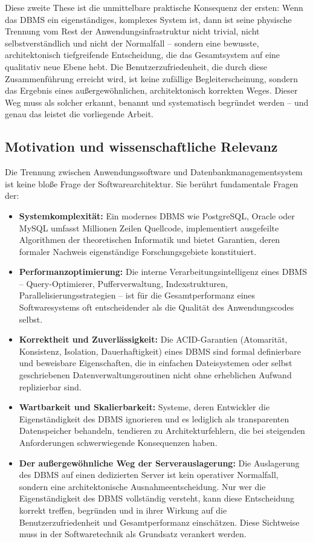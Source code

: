 ﻿\documentclass[a4paper,12pt]{article}
\theoremstyle{definition}
\begin{document}
Diese zweite These ist die unmittelbare praktische Konsequenz der ersten: Wenn das DBMS ein eigenständiges, komplexes System ist, dann ist seine physische Trennung vom Rest der Anwendungsinfrastruktur nicht trivial, nicht selbstverständlich und nicht der Normalfall -- sondern eine bewusste, architektonisch tiefgreifende Entscheidung, die das Gesamtsystem auf eine qualitativ neue Ebene hebt. Die Benutzerzufriedenheit, die durch diese Zusammenführung erreicht wird, ist keine zufällige Begleiterscheinung, sondern das Ergebnis eines außergewöhnlichen, architektonisch korrekten Weges. Dieser Weg muss als solcher erkannt, benannt und systematisch begründet werden -- und genau das leistet die vorliegende Arbeit.

\subsection{Motivation und wissenschaftliche Relevanz}

Die Trennung zwischen Anwendungssoftware und Datenbankmanagementsystem ist keine bloße Frage der Softwarearchitektur. Sie berührt fundamentale Fragen der:

\begin{itemize}
	\item \textbf{Systemkomplexität:} Ein modernes DBMS wie PostgreSQL, Oracle oder MySQL umfasst Millionen Zeilen Quellcode, implementiert ausgefeilte Algorithmen der theoretischen Informatik und bietet Garantien, deren formaler Nachweis eigenständige Forschungsgebiete konstituiert.
	\item \textbf{Performanzoptimierung:} Die interne Verarbeitungsintelligenz eines DBMS -- Query-Optimierer, Pufferverwaltung, Indexstrukturen, Parallelisierungsstrategien -- ist für die Gesamtperformanz eines Softwaresystems oft entscheidender als die Qualität des Anwendungscodes selbst.
	\item \textbf{Korrektheit und Zuverlässigkeit:} Die ACID-Garantien (Atomarität, Konsistenz, Isolation, Dauerhaftigkeit) eines DBMS sind formal definierbare und beweisbare Eigenschaften, die in einfachen Dateisystemen oder selbst geschriebenen Datenverwaltungsroutinen nicht ohne erheblichen Aufwand replizierbar sind.
	\item \textbf{Wartbarkeit und Skalierbarkeit:} Systeme, deren Entwickler die Eigenständigkeit des DBMS ignorieren und es lediglich als transparenten Datenspeicher behandeln, tendieren zu Architekturfehlern, die bei steigenden Anforderungen schwerwiegende Konsequenzen haben.
\item \textbf{Der außergewöhnliche Weg der Serverauslagerung:} Die Auslagerung des DBMS auf einen dedizierten Server ist kein operativer Normalfall, sondern eine architektonische Ausnahmeentscheidung. Nur wer die Eigenständigkeit des DBMS vollständig versteht, kann diese Entscheidung korrekt treffen, begründen und in ihrer Wirkung auf die Benutzerzufriedenheit und Gesamtperformanz einschätzen. Diese Sichtweise muss in der Softwaretechnik als Grundsatz verankert werden.
\end{itemize}
\end{document}
